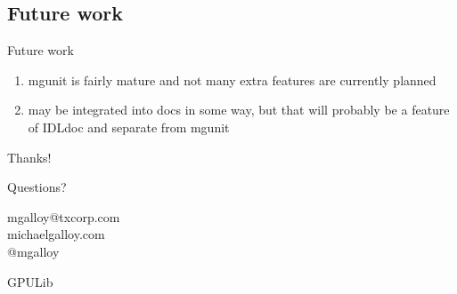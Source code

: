 \documentclass[12pt, handout]{beamer}
\begin{document}
\subsection{Future work}
\begin{frame}[t]{Future work}
  \begin{enumerate}
    \item mgunit is fairly mature and not many extra features are currently planned
    \item may be integrated into docs in some way, but that will probably be a feature of IDLdoc and separate from mgunit
  \end{enumerate}
\end{frame}

\begin{frame}{Thanks!}
  \begin{center}

{\huge Questions?} \\

\bigskip

{mgalloy@txcorp.com} \\
{michaelgalloy.com} \\
{@mgalloy}

\end{center}
\end{frame}

\appendix

\begin{frame}{GPULib}
\hypertarget{gpulib}{}

\hyperlink{examples}{}
\end{frame}
\end{document}
